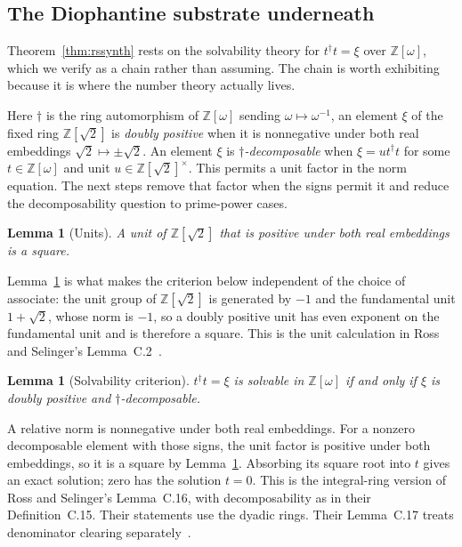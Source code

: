 \documentclass[aps,pra,reprint,nofootinbib,superscriptaddress]{revtex4-2}
\theoremstyle{plain}
\newtheorem{lemma}[theorem]{Lemma}
\theoremstyle{definition}
\begin{document}
\subsection{The Diophantine substrate underneath}
\label{sec:length-appc}

Theorem~\ref{thm:rssynth} rests on the solvability theory for
$t^{\dagger}t = \xi$ over $\mathbb Z[\omega]$, which we verify as a chain
rather than assuming. The chain is worth exhibiting because it is where the
number theory actually lives.

Here $\dagger$ is the ring automorphism of $\mathbb Z[\omega]$ sending
$\omega \mapsto \omega^{-1}$, an element $\xi$ of the fixed ring
$\mathbb Z[\sqrt 2]$ is \emph{doubly positive} when it is nonnegative under
both real embeddings $\sqrt 2 \mapsto \pm\sqrt 2$. An element $\xi$ is \emph{$\dagger$-decomposable} when
$\xi=u t^{\dagger}t$ for some $t\in\mathbb Z[\omega]$ and unit
$u\in\mathbb Z[\sqrt 2]^\times$. This permits a unit factor in the norm
equation. The next steps remove that factor when the signs permit it
and reduce the decomposability question to prime-power cases.

\begin{lemma}[Units]
\label{lem:c2}
A unit of $\mathbb Z[\sqrt 2]$ that is positive under both real embeddings is a
square.
\end{lemma}

Lemma~\ref{lem:c2} is what makes the criterion below independent of the choice
of associate: the unit group of $\mathbb Z[\sqrt 2]$ is generated by $-1$ and
the fundamental unit $1+\sqrt 2$, whose norm is $-1$, so a doubly positive unit
has even exponent on the fundamental unit and is therefore a square. This is
the unit calculation in Ross and Selinger's Lemma~C.2~\cite{RossSelinger2016}.

\begin{lemma}[Solvability criterion]
\label{lem:c16}
$t^{\dagger}t = \xi$ is solvable in $\mathbb Z[\omega]$ if and only if $\xi$ is
doubly positive and $\dagger$-decomposable.
\end{lemma}

A relative norm is nonnegative under both real embeddings. For a
nonzero decomposable element with those signs, the unit factor is
positive under both embeddings, so it is a square by Lemma~\ref{lem:c2}.
Absorbing its square root into $t$ gives an exact solution; zero has
the solution $t=0$. This is the integral-ring version of
Ross and Selinger's Lemma~C.16, with decomposability as in their
Definition~C.15. Their statements use the dyadic rings.
Their Lemma~C.17 treats denominator clearing separately~\cite{RossSelinger2016}.
\end{document}
